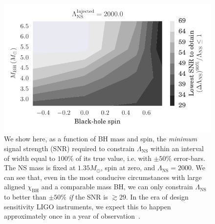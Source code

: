 \documentclass[aps,prd,amsmath,floats,floatfix, twocolumn,
superscriptaddress,nofootinbib,showpacs]{revtex4-1}
\newcommand{\lambdans}{\Lambda_\mathrm{NS}}
\newcommand{\chibh}{\chi_\mathrm{BH}}
\begin{document}
\begin{figure}
\centering    
\includegraphics[width=\columnwidth]{plots/TTSNRThresholdFor100LambdaMeasurement_BHspin_BHmass_Lambda2000_0_CI90_0}
\caption{
We show here, as a function of BH mass and spin, the {\it minimum} signal
strength (SNR) required to constrain $\lambdans$ within an interval of width
equal to $100\%$ of its true value, i.e. with $\pm 50\%$ error-bars. The NS mass
is fixed at $1.35M_\odot$, spin at zero, and $\lambdans=2000$.
% 
We can see that, even in the most conducive circumstances with large aligned 
$\chibh$ and a comparable mass BH, we can only constrain $\lambdans$ to better
than $\pm 50\%$ {\it if} the SNR is $\gtrsim 29$. In the era of design
sensitivity LIGO instruments, we expect this to happen approximately once in a
year of observation~\cite{Abadie:2010cfa}.
% 
% 
}
\label{fig:TT_SNRThresholds_BHspin_BHmass_CI90_0}
\end{figure}
\end{document}
